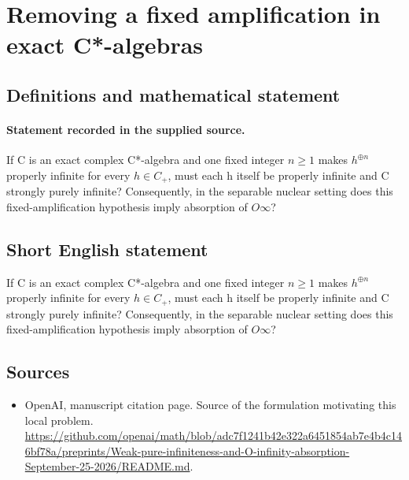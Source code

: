 \documentclass[11pt]{article}
\begin{document}
\section*{Removing a fixed amplification in exact C*-algebras}\label{30007299}
\subsection{Definitions and mathematical statement}
\paragraph{Statement recorded in the supplied source.}
If C is an exact complex C*-algebra and one fixed integer $n\geq 1$ makes $h^{\oplus n}$ properly infinite for every $h\in C_+$, must each h itself be properly infinite and C strongly purely infinite? Consequently, in the separable nuclear setting does this fixed-amplification hypothesis imply absorption of $O\infty $?
\subsection{Short English statement}
If C is an exact complex C*-algebra and one fixed integer $n\geq 1$ makes $h^{\oplus n}$ properly infinite for every $h\in C_+$, must each h itself be properly infinite and C strongly purely infinite? Consequently, in the separable nuclear setting does this fixed-amplification hypothesis imply absorption of $O\infty $?
\subsection{Sources}
\begin{itemize}
\item[S1] OpenAI, manuscript citation page. Source of the formulation motivating this local problem.
\url{https://github.com/openai/math/blob/adc7f1241b42e322a6451854ab7e4b4c146bf78a/preprints/Weak-pure-infiniteness-and-O-infinity-absorption-September-25-2026/README.md}.
\end{itemize}
\end{document}
